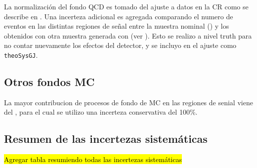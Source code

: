 La normalización del fondo QCD {\gjet} es tomado del ajuste a datos en la CR como se describe en {\XXX}.
Una incerteza adicional es agregada comparando el numero de eventos en las distintas regiones de señal
entre la muestra nominal (\sherpa) y los obtenidos con otra muestra generada con {\pythia} (ver {\tab} \XXX).
Esto se realizo a nivel truth para no contar nuevamente los efectos del detector, y se incluyo en el ajuste
como \texttt{theoSysGJ}.



\subsection{Otros fondos MC}

La mayor contribucion de procesos de fondo de MC en las regiones de senial viene del
{\zgam}, para el cual se utilizo una incerteza conservativa del 100\%.


\subsection{Resumen de las incertezas sistemáticas}\label{sec:syst_break}
\hl{Agregar tabla resumiendo todas las incertezas sistemáticas}
